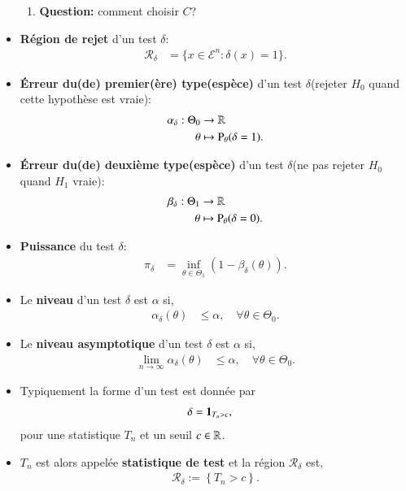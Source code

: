\begin{frame}
\begin{itemize}
\begin{enumerate}[-]
               \item \textbf{Question:} comment choisir $C$?
         \end{enumerate}
         \framebreak
         \item \textbf{Région de rejet} d'un test $\delta$: \begin{align*}
             \mathcal{R}_{\delta} &=\{x\in \mathcal{E}^n: \delta(x) = 1\}.
         \end{align*}
         \item \textbf{Érreur du(de) premier(ère) type(espèce)} d'un test $\delta$(rejeter $H_0$ quand cette hypothèse est vraie):
         \begin{align*}
             \alpha_\delta : \Theta_0 &\rightarrow \mathbb{R}\\
             \theta &\mapsto \operatorname{P}_\theta(\delta = 1).
         \end{align*}
         \item \textbf{Érreur du(de) deuxième type(espèce)} d'un test $\delta$(ne pas rejeter $H_0$ quand $H_1$ vraie):
         \begin{align*}
            \beta_\delta : \Theta_1 &\rightarrow \mathbb{R}\\
            \theta &\mapsto \operatorname{P}_\theta(\delta = 0).
        \end{align*}
        \item \textbf{Puissance} du test $\delta$:
        \begin{align*}
            \pi_\delta &=\inf_{\theta\in\Theta_1}\left(1- \beta_\delta(\theta)\right).
        \end{align*}
        \framebreak 
        \item Le \textbf{niveau} d'un test $\delta$ est $\alpha$ si,\begin{align*}
            \alpha_\delta(\theta) &\leq \alpha,  \quad \forall \theta \in \Theta_0.
        \end{align*}
        \item Le \textbf{niveau asymptotique} d'un test $\delta$ est $\alpha$ si,\begin{align*}
            \lim_{n\to \infty}\alpha_\delta(\theta) &\leq \alpha,  \quad \forall \theta \in \Theta_0.
        \end{align*}
        \item Typiquement la forme d'un test est donnée par
        \begin{align*}
            \delta &=\mathbf{1}_{T_n> c},
        \end{align*}
        pour une statistique $T_n$ et un seuil $c\in \mathbb{R}$.
        \item $T_n$ est alors appelée \textbf{statistique de test} et la région $\mathcal{R}_\delta$ est, 
        \begin{align*}
            \mathcal{R}_\delta := \left\{T_n > c\right\}.
        \end{align*}
    \end{itemize}
\end{frame}
